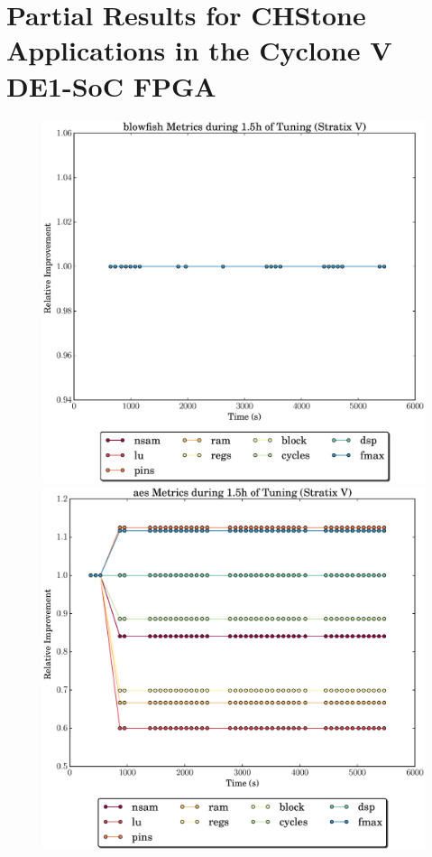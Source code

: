 \documentclass[12pt, a4paper]{article}
\begin{document}
\section*{Partial Results for CHStone Applications in the Cyclone V DE1-SoC FPGA}

\begin{figure}[htpb]
    \centering
    \begin{minipage}{.48\textwidth}
        \centering
        \includegraphics[scale=.29]{blowfish_all_5400_chstone_StratixV}
    \end{minipage}%
    \hfill
    \begin{minipage}{.48\textwidth}
        \centering
        \includegraphics[scale=.29]{aes_all_5400_chstone_StratixV}
    \end{minipage}%


\end{figure}
\end{document}
